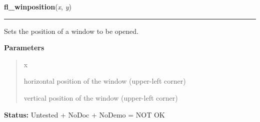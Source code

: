 \hspace{.8\funcindent}\begin{boxedminipage}{\funcwidth}

    \raggedright \textbf{fl\_winposition}(\textit{x}, \textit{y})

    \vspace{-1.5ex}

    \rule{\textwidth}{0.5\fboxrule}
\setlength{\parskip}{2ex}
    Sets the position of a window to be opened.

\setlength{\parskip}{1ex}
      \textbf{Parameters}
      \vspace{-1ex}

      \begin{quote}
        \begin{Ventry}{x}

          \item[x]

          horizontal position of the window (upper-left corner)

          \item[y]

          vertical position of the window (upper-left corner)

        \end{Ventry}

      \end{quote}

\textbf{Status:} Untested + NoDoc + NoDemo = NOT OK



    \end{boxedminipage}

    \label{xformslib:library:fl_winposition}

    \vspace{0.5ex}

